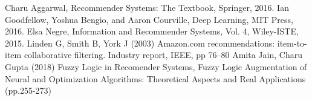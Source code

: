 \documentclass{article}
\begin{document}
\newpage

\begin{thebibliography}{99}
     Charu Aggarwal, Recommender Systems: The Textbook, Springer, 2016. Ian Goodfellow, Yoshua Bengio, and Aaron Courville, Deep Learning, MIT Press, 2016.
     Elsa Negre, Information and Recommender Systems, Vol. 4, Wiley-ISTE, 2015.
     Linden G, Smith B, York J (2003) Amazon.com recommendations: item-to-item collaborative filtering. Industry report, IEEE, pp 76–80
     Amita Jain, Charu Gupta (2018) Fuzzy Logic in Recomender Systems, Fuzzy Logic Augmentation of Neural and Optimization Algorithms: Theoretical Aspects and Real Applications (pp.255-273)
\end{thebibliography}
\end{document}
